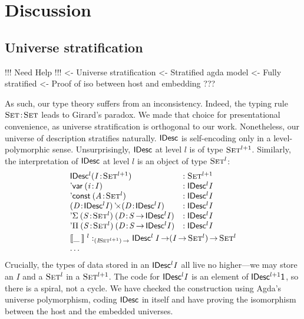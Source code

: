 \section{Discussion}
\label{sec:discussion}

\subsection{Universe stratification}

\begin{wstructure}
!!! Need Help !!!
<- Universe stratification
    <- Stratified agda model
        <- Fully stratified
        <- Proof of iso between host and embedding
    ???
\end{wstructure}

As such, our type theory suffers from an inconsistency. Indeed, the
typing rule $\Bhab{\Set}{\Set}$ leads to Girard's paradox. We made
that choice for presentational convenience, as universe stratification
is orthogonal to our work. Nonetheless, our universe of description
stratifies naturally. $\SYMBIDesc$ is self-encoding only in a
level-polymorphic sense.  Unsurprisingly, $\SYMBIDesc$ at level $l$ is
of type $\Set^{\blue{l+1}}$. Similarly, the interpretation of
$\SYMBIDesc$ at level $l$ is an object of type $\Set^{\blue{l}}$:
%
\[\stk{\begin{array}{@{}ll}
\SYMBIDesc^{\blue{l}} (\Bhab{\M{I}}{\Set^{\blue{l+1}}}) & :\Set^{\blue{l+1}} \\
\DVar{(\Bhab{\M{i}}{\M{I}})} &: \SYMBIDesc^{\blue{l}}{\M{I}} \\
\DConst{(\Bhab{\M{A}}{\Set^{\blue{l}}})} &:\SYMBIDesc^{\blue{l}}{\M{I}}       \\
\DProd{(\Bhab{\M{D}}{\SYMBIDesc^{\blue{l}}{\M{I}}})}{(\Bhab{\M{D}}{\SYMBIDesc^{\blue{l}}{\M{I}}})}
  & :\SYMBIDesc^{\blue{l}}{\M{I}}       \\
\DSigma{(\Bhab{\M{S}}{\Set^{\blue{l}}})}{(\Bhab{\M{D}}{\M{S}\To\SYMBIDesc^{\blue{l}}{\M{I}}})}
& : \SYMBIDesc^{\blue{l}}{\M{I}}  \\
\DPi{(\Bhab{\M{S}}{\Set^{\blue{l}}})}{(\Bhab{\M{D}}{\M{S}\To\SYMBIDesc^{\blue{l}}{\M{I}}})}
& : \SYMBIDesc^{\blue{l}}{\M{I}}  \\
\end{array}\smallskip \\
\idescop{\_\:}{}{}^{\blue{l}} : _{\PI{\V{I}}{\Set^{\blue{l+1}}}} \SYMBIDesc^{\blue{l}}\:\V{I} \To (\V{I} \To \Set^{\blue{l}}) \To \Set^{\blue{l}}    \\
\ldots
}
\]
Crucially, the types of data stored in an
\(\SYMBIDesc^{\blue{l}}{\M{I}}\) all live no higher---we may store an
\(I\) and a \(\Set^{\blue{l}}\) in a \(\Set^{\blue{l+1}}\).  The code
for \(\SYMBIDesc^{\blue{l}}{\M{I}}\) is an element of
\(\SYMBIDesc^{\blue{l+1}}{\Unit}\), so there is a spiral, not a cycle.
We have checked the construction using Agda's universe polymorphism,
coding $\SYMBIDesc$ in itself and have proving the isomorphism
between the host and the embedded universes.

